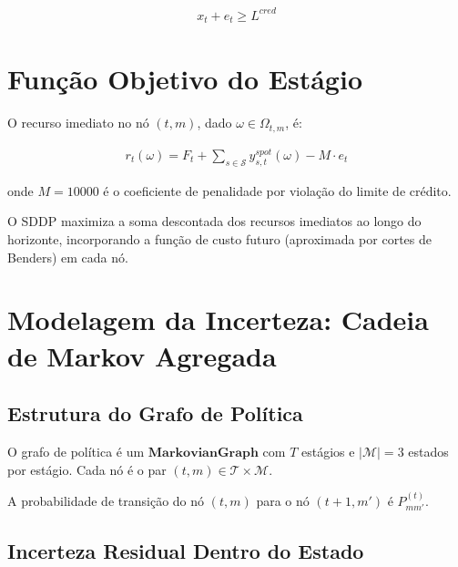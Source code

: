 \documentclass{article}
\begin{document}
\begin{align}
    x_t + e_t \geq L^{cred}
\end{align}

\section{Função Objetivo do Estágio}

O recurso imediato no nó $(t, m)$, dado $\omega \in \Omega_{t,m}$, é:

\begin{align}
    r_t(\omega) =
    F_t + \sum_{s \in \mathcal{S}} y^{spot}_{s,t}(\omega) - M \cdot e_t
\end{align}

onde $M = 10000$ é o coeficiente de penalidade por violação do limite de crédito.

O SDDP maximiza a soma descontada dos recursos imediatos ao longo do horizonte, incorporando
a função de custo futuro (aproximada por cortes de Benders) em cada nó.

\section{Modelagem da Incerteza: Cadeia de Markov Agregada}

\subsection{Estrutura do Grafo de Política}

O grafo de política é um $\mathbf{MarkovianGraph}$ com $T$ estágios e $|\mathcal{M}| = 3$
estados por estágio. Cada nó é o par $(t, m) \in \mathcal{T} \times \mathcal{M}$.

A probabilidade de transição do nó $(t, m)$ para o nó $(t+1, m')$ é $P^{(t)}_{mm'}$.

\subsection{Incerteza Residual Dentro do Estado}
\end{document}
